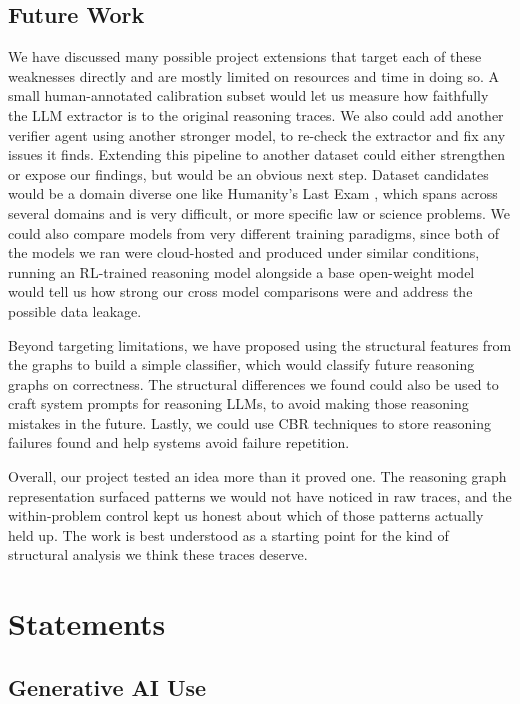 \documentclass[letterpaper]{article}
\begin{document}
\subsection{Future Work}
We have discussed many possible project extensions that target each of these weaknesses directly and are mostly limited on resources and time in doing so. A small human-annotated calibration subset would let us measure how faithfully the LLM extractor is to the original reasoning traces. We also could add another verifier agent using another stronger model, to re-check the extractor and fix any issues it finds. Extending this pipeline to another dataset could either strengthen or expose our findings, but would be an obvious next step. Dataset candidates would be a domain diverse one like Humanity's Last Exam \cite{phan2025lastexam}, which spans across several domains and is very difficult, or more specific law or science problems. We could also compare models from very different training paradigms,
since both of the models we ran were cloud-hosted and produced under
similar conditions, running an RL-trained reasoning model alongside
a base open-weight model would tell us how strong our cross model comparisons were and address the possible data leakage.

Beyond targeting limitations, we have proposed using the structural features from the graphs to build a simple classifier, which would classify future reasoning graphs on correctness. The structural differences we found could also be used to craft system prompts for reasoning LLMs, to avoid making those reasoning mistakes in the future. Lastly, we could use CBR techniques to store reasoning failures found and help systems avoid failure repetition.

Overall, our project tested an idea more than it proved one. The
reasoning graph representation surfaced patterns we would not have
noticed in raw traces, and the within-problem control kept us
honest about which of those patterns actually held up. The
work is best understood as a starting point for the kind of
structural analysis we think these traces deserve.

\section{Statements}

\subsection{Generative AI Use}
\end{document}
